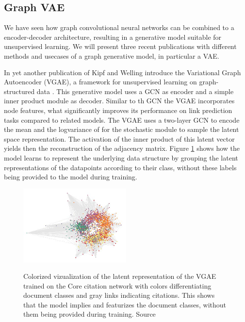 \subsection{Graph VAE}
We have seen how graph convolutional neural networks can be combined to a encoder-decoder architecture, resulting in a generative model suitable for unsupervised learning. We will present three recent publications with different methods and usecases of a graph generative model, in particular a VAE.

In yet another publication of Kipf and Welling introduce the Variational Graph Autoencoder (VGAE), a framework for unsupervised learning on graph-structured data \cite{kipf_variational_2016}. This generative model uses a GCN as encoder and a simple inner product module as decoder. Similar to th GCN the VGAE incorporates node features, what significantly improves its performance on link prediction tasks compared to related models. The VGAE uses a two-layer GCN to encode the mean and the logvariance of for the stochastic module to sample the latent space representation. The activation of the inner product of this latent vector yields then the reconstruction of the adjacency matrix. Figure \ref{fig:kipfGVAE} shows how the model learns to represent the underlying data structure by grouping the latent representations of the datapoints according to their class, without these labels being provided to the model during training.

\begin{figure}[h]
    \centering
    \includegraphics[width=0.5\textwidth]{data/images/KipGVAE.jpg}
    \label{fig:kipfGVAE}
    \caption{Colorized vizualization of the latent representation of the VGAE trained on the Core citation network with colors differentiating document classes and gray links indicating citations. This shows that the model implies and featurizes the document classes, without them being provided during training. Source \cite{kipf_variational_2016}}
\end{figure}

